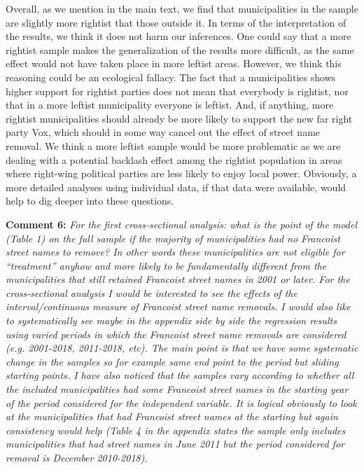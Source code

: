 \documentclass[12pt, a4paper, notitlepage]{article}
\begin{document}
Overall, as we mention in the main text, we find that municipalities in the sample are slightly more rightist that those outside it. In terms of the interpretation of the results, we think it does not harm our inferences. One could say that a more rightist sample makes the generalization of the results more difficult, as the same effect would not have taken place in more leftist areas. However, we think this reasoning could be an ecological fallacy. The fact that a municipalities shows higher support for rightist parties does not mean that everybody is rightist, nor that in a more leftist municipality everyone is leftist.
And, if anything, more rightist municipalities should already be more likely to support the new far right party Vox, which should in some way cancel out the effect of street name removal.
We think a more leftist sample would be more problematic as we are dealing with a potential backlash effect among the rightist population in areas where right-wing political parties are less likely to enjoy local power.
Obviously, a more detailed analyses using individual data, if that data were available, would help to dig deeper into these questions.

\textbf{Comment 6:} \textit{For the first cross-sectional analysis: what is the point of the model (Table 1) on the full sample if the majority of municipalities had no Francoist street names to remove? In other words these municipalities are not eligible for “treatment” anyhow and more likely to be fundamentally different from the municipalities that still retained Francoist street names in 2001 or later.
For the cross-sectional analysis I would be interested to see the effects of the interval/continuous measure of Francoist street name removals. I would also like to systematically see maybe in the appendix side by side the regression results using varied periods in which the Francoist street name removals are considered (e.g. 2001-2018, 2011-2018, etc). The main point is that we have some systematic change in the samples so for example same end point to the period but sliding starting points. I have also noticed that the samples vary according to whether all the included municipalities had some Francoist street names in the starting year of the period considered for the independent variable. It is logical obviously to look at the municipalities that had Francoist street names at the starting but again consistency would help (Table 4 in the appendix states the sample only includes municipalities that had street names in June 2011 but the period considered for removal is December 2010-2018).}
\end{document}
